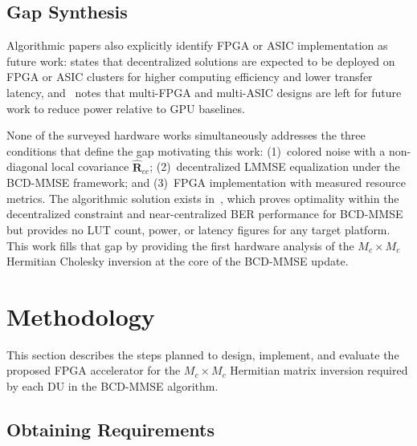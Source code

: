 \documentclass[12pt]{article}
\begin{document}
\subsection{Gap Synthesis}

Algorithmic papers also explicitly identify FPGA or ASIC
implementation as future work: \cite{jeon2019} states that decentralized
solutions are expected to be deployed on FPGA or ASIC clusters for higher
computing efficiency and lower transfer latency, and~\cite{li2019cd} notes
that multi-FPGA and multi-ASIC designs are left for future work to reduce
power relative to GPU baselines.

None of the surveyed hardware works simultaneously addresses the three
conditions that define the gap motivating this work: (1)~colored noise
with a non-diagonal local covariance $\hat{\mathbf{R}}_{cc}$;
(2)~decentralized LMMSE equalization under the BCD-MMSE framework; and
(3)~FPGA implementation with measured resource metrics. The algorithmic
solution exists in~\cite{zhao2025jsac}, which proves optimality within the decentralized constraint and
near-centralized BER performance for BCD-MMSE but provides no LUT count,
power, or latency figures for any target platform. This work fills that
gap by providing the first hardware analysis of the $M_c \times M_c$
Hermitian Cholesky inversion at the core of the BCD-MMSE update.

\section{Methodology}
\label{sec:methodology}
%


This section describes the steps planned to design, implement, and
evaluate the proposed FPGA accelerator for the $M_c \times M_c$ Hermitian
matrix inversion required by each DU in the BCD-MMSE algorithm.

\subsection{Obtaining Requirements}
\end{document}

